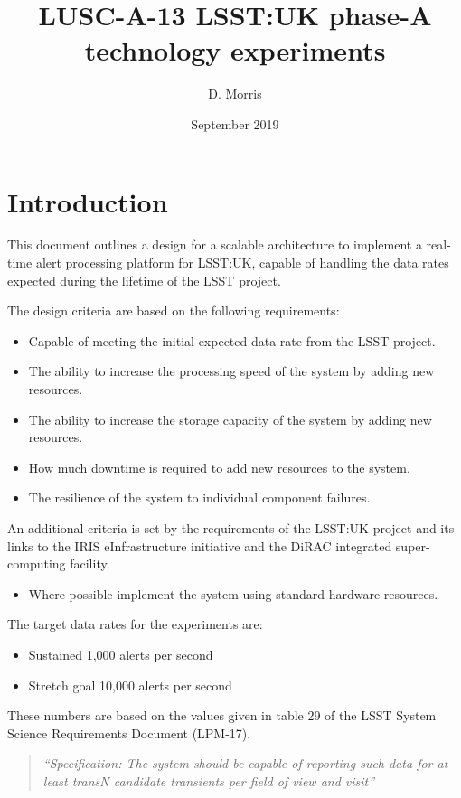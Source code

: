 \documentclass{article}
\title{LUSC-A-13 LSST:UK phase-A technology experiments}
\author{D. Morris}
\date{September 2019}
\newcommand{\lsst} {LSST\xspace}
\newcommand{\lsstuk} {LSST:UK\xspace}
\newcommand{\iris} {IRIS\xspace}
\begin{document}
\maketitle

\tableofcontents

\section{Introduction}
\label{introduction}
This document outlines a design for a scalable architecture to implement a real-time alert
processing platform for \lsstuk, capable of handling the data rates expected during the
lifetime of the \lsst project.

The design criteria are based on the following requirements:
\begin{itemize}
  \item Capable of meeting the initial expected data rate from the \lsst project.
  \item The ability to increase the processing speed of the system by adding new resources.
  \item The ability to increase the storage capacity of the system by adding new resources.
  \item How much downtime is required to add new resources to the system.
  \item The resilience of the system to individual component failures.
\end{itemize}

An additional criteria is set by the requirements of the \lsstuk project and its
links to the \iris eInfrastructure initiative and the DiRAC integrated super-computing facility.
\begin{itemize}
  \item Where possible implement the system using standard hardware resources.
\end{itemize}

The target data rates for the experiments are:
\begin{itemize}
  \item Sustained 1,000 alerts per second
  \item Stretch goal 10,000 alerts per second
\end{itemize}

These numbers are based on the values given in table 29 of the \lsst System Science Requirements Document (LPM-17).

\begin{quote}
\textit{“Specification: The system should be capable of reporting such data for at least transN candidate transients per field of view and visit”}
\end{quote}
\end{document}
